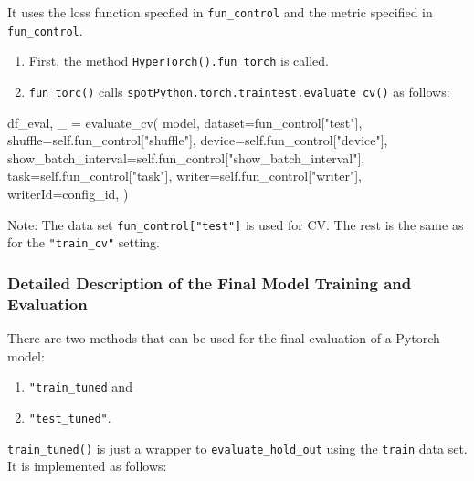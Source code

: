 \documentclass[
  letterpaper,
  DIV=11,
  numbers=noendperiod]{scrreprt}
\newenvironment{Shaded}{\begin{snugshade}}{\end{snugshade}}
\newcommand{\NormalTok}[1]{\textcolor[rgb]{0.00,0.23,0.31}{#1}}
\providecommand{\tightlist}{%
  \setlength{\itemsep}{0pt}\setlength{\parskip}{0pt}}\usepackage{longtable,booktabs,array}
\begin{document}
It uses the loss function specfied in \texttt{fun\_control} and the
metric specified in \texttt{fun\_control}.

\begin{enumerate}
\def\labelenumi{\arabic{enumi}.}
\tightlist
\item
  First, the method \texttt{HyperTorch().fun\_torch} is called.
\item
  \texttt{fun\_torc()} calls
  \texttt{spotPython.torch.traintest.evaluate\_cv()} as follows:
\end{enumerate}

\begin{Shaded}
\begin{Highlighting}[]
\NormalTok{df\_eval, \_ = evaluate\_cv(}
\NormalTok{    model,}
\NormalTok{    dataset=fun\_control["test"],}
\NormalTok{    shuffle=self.fun\_control["shuffle"],}
\NormalTok{    device=self.fun\_control["device"],}
\NormalTok{    show\_batch\_interval=self.fun\_control["show\_batch\_interval"],}
\NormalTok{    task=self.fun\_control["task"],}
\NormalTok{    writer=self.fun\_control["writer"],}
\NormalTok{    writerId=config\_id,}
\NormalTok{)}
\end{Highlighting}
\end{Shaded}

Note: The data set \texttt{fun\_control{[}"test"{]}} is used for CV. The
rest is the same as for the \texttt{"train\_cv"} setting.

\subsubsection{Detailed Description of the Final Model Training and
Evaluation}\label{sec-final-model-evaluation}

There are two methods that can be used for the final evaluation of a
Pytorch model:

\begin{enumerate}
\def\labelenumi{\arabic{enumi}.}
\tightlist
\item
  \texttt{"train\_tuned} and
\item
  \texttt{"test\_tuned"}.
\end{enumerate}

\texttt{train\_tuned()} is just a wrapper to
\texttt{evaluate\_hold\_out} using the \texttt{train} data set. It is
implemented as follows:
\end{document}
